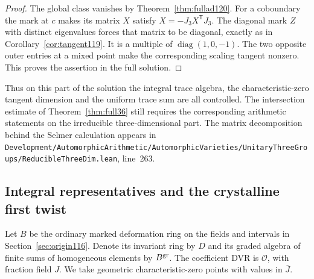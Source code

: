 \documentclass[a4paper,11pt]{article}
\theoremstyle{definition}
\theoremstyle{remark}
\newcommand{\srcloc}[2]{{\small\nolinkurl{#1.lean}}, line~#2}
\numberwithin{equation}{section}
\newcommand{\OO}{\mathcal O}
\begin{document}
\begin{proof}
The global class vanishes by Theorem~\ref{thm:fullad120}.
For a coboundary the mark at \(c\) makes its matrix \(X\)
satisfy \(X=-J_3X^{\mathsf T}J_3\). The diagonal mark
\(Z\) with distinct eigenvalues forces that matrix to be
diagonal, exactly as in Corollary~\ref{cor:tangent119}.
It is a multiple of \(\operatorname{diag}(1,0,-1)\).
The two opposite outer entries at a mixed point make the
corresponding scaling tangent nonzero. This proves the
assertion in the full solution.
\end{proof}

Thus on this part of the solution the integral trace algebra,
the characteristic-zero tangent dimension and the uniform
trace sum are all controlled. The intersection estimate of
Theorem~\ref{thm:full36} still requires the corresponding
arithmetic statements on the irreducible three-dimensional
part. The matrix decomposition behind the Selmer calculation
appears in
\srcloc{Development/AutomorphicArithmetic/AutomorphicVarieties/UnitaryThreeGroups/ReducibleThreeDim}{263}.

\subsection{Integral representatives and the crystalline first twist}\label{nav:IV-21}
\label{sec:crystalline121}

Let \(B\) be the ordinary marked deformation ring on the fields
and intervals in Section~\ref{sec:origin116}. Denote its
invariant ring by \(D\) and its graded algebra of finite sums
of homogeneous elements by \(B^{\rm gr}\). The coefficient
DVR is \(\OO\), with fraction field \(J\). We take geometric
characteristic-zero points with values in \(\overline J\).
\end{document}
